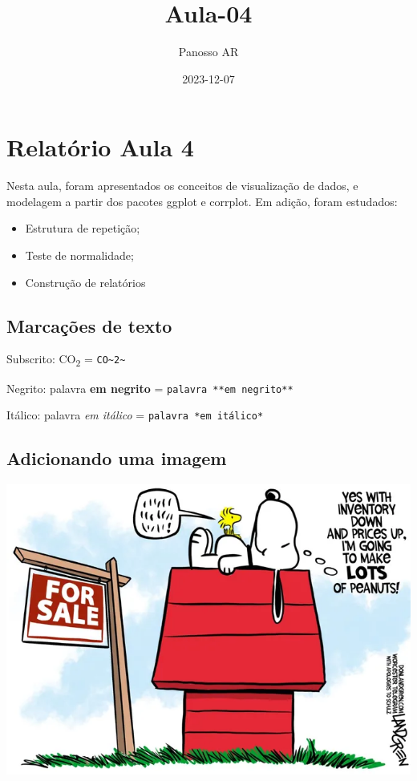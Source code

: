 \documentclass[
]{article}
\title{Aula-04}
\author{Panosso AR}
\date{2023-12-07}
\begin{document}
\maketitle

\hypertarget{relatuxf3rio-aula-4}{%
\section{Relatório Aula 4}\label{relatuxf3rio-aula-4}}

Nesta aula, foram apresentados os conceitos de visualização de dados, e
modelagem a partir dos pacotes ggplot e corrplot. Em adição, foram
estudados:

\begin{itemize}
\item
  Estrutura de repetição;
\item
  Teste de normalidade;
\item
  Construção de relatórios
\end{itemize}

\hypertarget{marcauxe7uxf5es-de-texto}{%
\subsection{Marcações de texto}\label{marcauxe7uxf5es-de-texto}}

Subscrito: CO\textsubscript{2} =
\texttt{CO\textasciitilde{}2\textasciitilde{}}

Negrito: palavra \textbf{em negrito} = \texttt{palavra\ **em\ negrito**}

Itálico: palavra \emph{em itálico} = \texttt{palavra\ *em\ itálico*}

\hypertarget{adicionando-uma-imagem}{%
\subsection{Adicionando uma imagem}\label{adicionando-uma-imagem}}

\includegraphics{snoopy.png}
\end{document}
